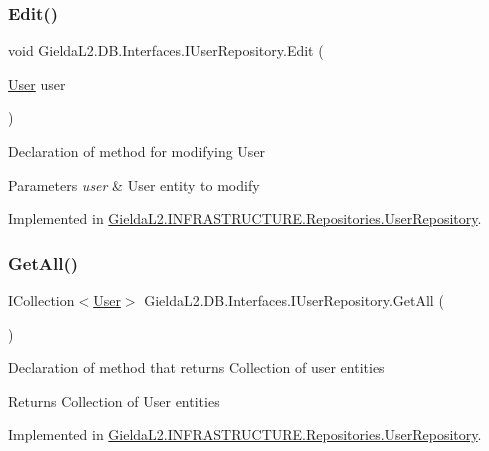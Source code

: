 \subsubsection{\texorpdfstring{Edit()}{Edit()}}
{\footnotesize\ttfamily void Gielda\+L2.\+D\+B.\+Interfaces.\+I\+User\+Repository.\+Edit (\begin{DoxyParamCaption}\item[{\mbox{\hyperlink{class_gielda_l2_1_1_d_b_1_1_entities_1_1_user}{User}}}]{user }\end{DoxyParamCaption})}



Declaration of method for modifying User 


\begin{DoxyParams}{Parameters}
{\em user} & User entity to modify\\
\hline
\end{DoxyParams}


Implemented in \mbox{\hyperlink{class_gielda_l2_1_1_i_n_f_r_a_s_t_r_u_c_t_u_r_e_1_1_repositories_1_1_user_repository_a2e07a0a1dd9a6731ed8706b82c66fb49}{Gielda\+L2.\+I\+N\+F\+R\+A\+S\+T\+R\+U\+C\+T\+U\+R\+E.\+Repositories.\+User\+Repository}}.

\mbox{\label{interface_gielda_l2_1_1_d_b_1_1_interfaces_1_1_i_user_repository_ada0fb28a6665ffc0191086563dbeb28e}} 
\subsubsection{\texorpdfstring{GetAll()}{GetAll()}}
{\footnotesize\ttfamily I\+Collection$<$\mbox{\hyperlink{class_gielda_l2_1_1_d_b_1_1_entities_1_1_user}{User}}$>$ Gielda\+L2.\+D\+B.\+Interfaces.\+I\+User\+Repository.\+Get\+All (\begin{DoxyParamCaption}{ }\end{DoxyParamCaption})}



Declaration of method that returns Collection of user entities 

\begin{DoxyReturn}{Returns}
Collection of User entities
\end{DoxyReturn}


Implemented in \mbox{\hyperlink{class_gielda_l2_1_1_i_n_f_r_a_s_t_r_u_c_t_u_r_e_1_1_repositories_1_1_user_repository_ab9a56b5b0dfe9cf6350eebcf751adcfc}{Gielda\+L2.\+I\+N\+F\+R\+A\+S\+T\+R\+U\+C\+T\+U\+R\+E.\+Repositories.\+User\+Repository}}.

